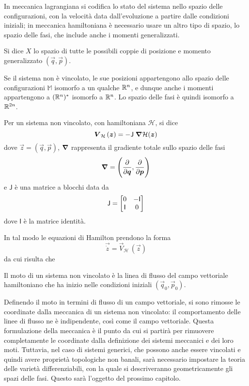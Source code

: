 In meccanica lagrangiana si codifica lo stato del sistema nello spazio delle configurazioni, con la velocità data dall'evoluzione a partire dalle condizioni iniziali; in meccanica hamiltoniana è necessario usare un altro tipo di spazio, lo spazio delle fasi, che include anche i momenti generalizzati.
\begin{definition}
  Si dice  $X$ lo spazio di tutte le possibili coppie di posizione e momento generalizzato $(\vec{q},\vec{p})$.
\end{definition}
\begin{remark}
  Se il sistema non è vincolato, le sue posizioni appartengono allo spazio delle configurazioni $\mathbb{M}$ isomorfo a un qualche $\mathbb{R}^{n}$, e dunque anche i momenti appartengono a $(\mathbb{R}^{n})^*$ isomorfo a $\mathbb{R}^{n}$. Lo spazio delle fasi è quindi isomorfo a $\mathbb{R}^{2n}$.
\end{remark}

\begin{definition} \label{eq:hamFieldUnconstr}
  Per un sistema non vincolato, con hamiltoniana $\mathcal{H}$, si dice  \begin{equation*}
    \boldsymbol{V}_{\mathcal{H}}\,(\boldsymbol{z}) = -\mathsf{J}\; \grad{\mathcal{H}} (\boldsymbol{z})
  \end{equation*}
  dove $\vec{z}=(\vec{q},\vec{p})$, $\grad$ rappresenta il gradiente totale sullo spazio delle fasi \begin{equation*}
    \grad = \Bigg(\pdv{\boldsymbol{q}},\pdv{\boldsymbol{p}}\Bigg) 
    \end{equation*}
    e $\mathsf{J}$ è una matrice a blocchi data da \begin{equation*}
    \mathsf{J} = \bmqty{0 & -\mathsf{I} \\ \mathsf{I} & 0}
    \end{equation*}
    dove $\mathsf{I}$ è la matrice identità.
\end{definition}

In tal modo le equazioni di Hamilton prendono la forma \begin{equation*}
\vec{\dot{z}} = \vec{V}_{\mathcal{H}}\, (\vec{z}) 
\end{equation*} 
da cui risulta che
\begin{theorem}
  Il moto di un sistema non vincolato è la linea di flusso del campo vettoriale hamiltoniano che ha inizio nelle condizioni iniziali $(\vec{q}_0, \vec{p}_0)$.
\end{theorem} 

Definendo il moto in termini di flusso di un campo vettoriale, si sono rimosse le coordinate dalla meccanica di un sistema non vincolato: il comportamento delle linee di flusso ne è indipendente, così come il campo vettoriale. Questa formulazione della meccanica è il punto da cui si partirà per rimuovere completamente le coordinate dalla definizione dei sistemi meccanici e dei loro moti. Tuttavia, nel caso di sistemi generici, che possono anche essere vincolati e quindi avere proprietà topologiche non banali, sarà necessario impostare la teoria delle varietà differenziabili, con la quale si descriveranno geometricamente gli spazi delle fasi. Questo sarà l'oggetto del prossimo capitolo.
